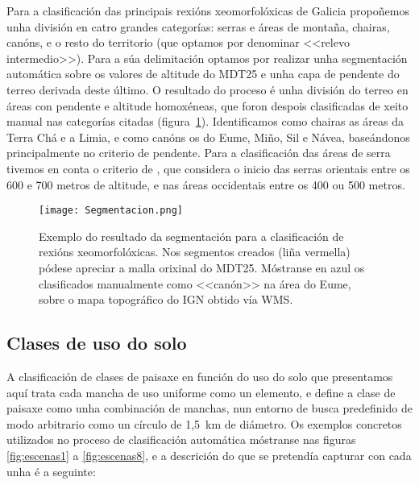 \documentclass[11pt,a4paper]{article}
\begin{document}
Para a clasificación das principais rexións xeomorfolóxicas de Galicia propoñemos unha división en catro grandes categorías: serras e áreas de montaña, chairas, canóns, e o resto do territorio (que optamos por denominar <<relevo intermedio>>). Para a súa delimitación optamos por realizar unha segmentación automática sobre os valores de altitude do MDT25 e unha capa de pendente do terreo derivada deste último. O resultado do proceso é unha división do terreo en áreas con pendente e altitude homoxéneas, que foron despois clasificadas de xeito manual nas categorías citadas (figura~\ref{fig:Morfo}). Identificamos como chairas as áreas da Terra Chá e a Limia, e como canóns os do Eume, Miño, Sil e Návea, baseándonos principalmente no criterio de pendente. Para a clasificación das áreas de serra tivemos en conta o criterio de \citet{PerezAlberti1986}, que considera o inicio das serras orientais entre os 600 e 700 metros de altitude, e nas áreas occidentais entre os 400 ou 500 metros.


\begin{figure}
\caption{Exemplo do resultado da segmentación para a clasificación de rexións xeomorfolóxicas. Nos segmentos creados (liña vermella) pódese apreciar a malla orixinal do MDT25. Móstranse en azul os clasificados manualmente como <<canón>> na área do Eume, sobre o mapa topográfico do IGN obtido vía WMS.}\label{fig:Morfo}
\texttt{[image: Segmentacion.png]}
\end{figure}

\subsection{Clases de uso do solo}

A clasificación de clases de paisaxe en función do uso do solo que presentamos aquí trata cada mancha de uso uniforme como un elemento, e define a clase de paisaxe como unha combinación de manchas, nun entorno de busca predefinido de modo arbitrario como un círculo de 1,5~km de diámetro. Os exemplos concretos utilizados no proceso de clasificación automática móstranse nas figuras \ref{fig:escenas1} a \ref{fig:escenas8}, e a descrición do que se pretendía capturar con cada unha é a seguinte:
\end{document}
